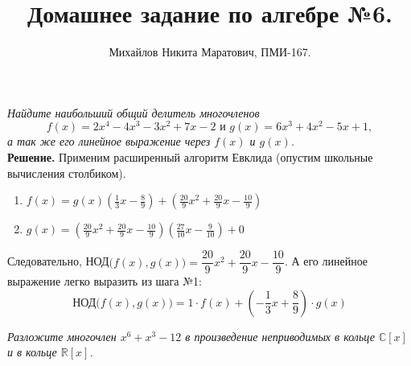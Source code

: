 \documentclass[a4paper, 12pt]{article}
\title{
     Домашнее задание по алгебре №6.
 }
\author{Михайлов Никита Маратович, ПМИ-167.
}
\date{}
\newcommand{\R}{\mathbb{R}}
\newcommand{\Co}{\mathbb{C}}
\begin{document}
\maketitle
\begin{spacing}{1}


\begin{center}
\end{center}

\noindent \textit{Найдите наибольший общий делитель многочленов
$$
f(x) = 2x^4-4x^3-3x^2+7x-2 \text{ и } g(x) = 6x^3+4x^2-5x+1,
$$
а так же его линейное выражение через $f(x)$ и $g(x)$.
}\\
\noindent \textbf{Решение.} Применим расширенный алгоритм Евклида (опустим школьные вычисления столбиком).
\begin{enumerate}
	\item $\displaystyle f(x) = g(x) (\frac{1}{3}x - \frac{8}{9}) + (\frac{20}{9}x^2+\frac{20}{9}x - \frac{10}{9})$
	\item $\displaystyle g(x) = (\frac{20}{9}x^2+\frac{20}{9}x - \frac{10}{9})(\frac{27}{10}x-\frac{9}{10})+0$
\end{enumerate}
Следовательно, НОД$\big(f(x), g(x)\big) = \dfrac{20}{9}x^2+\dfrac{20}{9}x - \dfrac{10}{9}$. А его линейное выражение легко выразить из шага №1:
$$
\text{НОД}\big(f(x), g(x)\big) = 1\cdot f(x) + (-\dfrac{1}{3}x + \dfrac{8}{9})\cdot g(x)
$$


\begin{center}
\end{center}

\noindent \textit{Разложите многочлен $x^6+x^3-12$ в произведение неприводимых в кольце $\Co [x]$ и в кольце $\R[x]$.}\\


\end{spacing}
\end{document}
